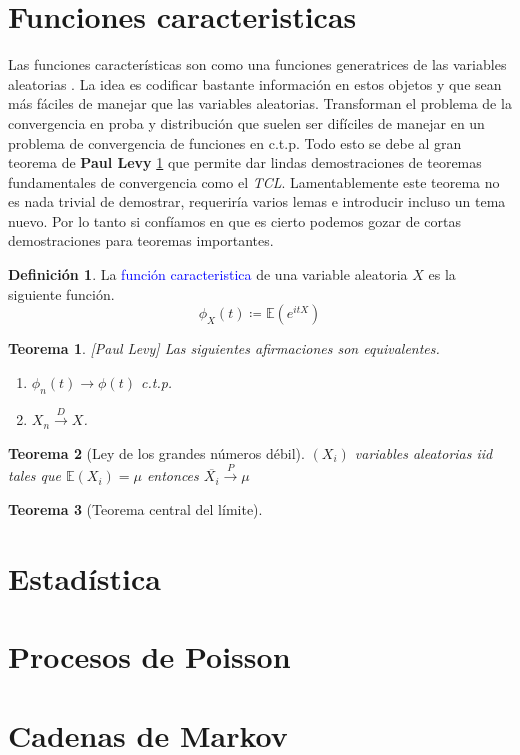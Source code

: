 \documentclass[11pt]{article}
\theoremstyle{plain} %
\newtheorem{teorema}{Teorema}
\theoremstyle{definition}
\newtheorem*{definicion}{Definici\'{o}n} %
\theoremstyle{remark}
\def\E{\mathbb{E}}
\def\va{variable aleatoria }
\def\vas{variables aleatorias }
\def\blue{\textcolor{blue}}
\newcommand{\proba}{\overset{P}{\to}}
\newcommand{\dist}{\overset{D}{\to}}
\begin{document}
\bigskip
\section{Funciones caracteristicas}

Las funciones características son como una funciones generatrices de las \vas. La idea es codificar bastante información en estos objetos y que sean más fáciles de manejar que las variables aleatorias. Transforman el problema de la convergencia en proba y distribución que suelen ser difíciles de manejar en un problema de convergencia de funciones en c.t.p. Todo esto se debe al gran teorema de \textbf{Paul Levy} \ref{teo:levy} que permite dar lindas demostraciones de teoremas fundamentales de convergencia como el \textit{TCL}. Lamentablemente este teorema no es nada trivial de demostrar, requeriría varios lemas e introducir incluso un tema nuevo. Por lo tanto si confíamos en que es cierto podemos gozar de cortas demostraciones para teoremas importantes.

\begin{definicion}
	La \blue{función caracteristica} de una \va $X$ es la siguiente función. 
	\[ \phi_{X}(t) \coloneqq \E(e^{itX}) \]
\end{definicion}

\begin{teorema}
	\label{teo:levy}
	[Paul Levy]
	Las siguientes afirmaciones son equivalentes.
	\begin{enumerate}
		\item $\phi_{n}(t) \to \phi(t)$ c.t.p.
		\item $X_n \dist X$.
	\end{enumerate}
\end{teorema}

\begin{teorema}
	[Ley de los grandes números débil]
	$(X_i) $ \vas iid tales que $\E(X_i) = \mu$ entonces $\overline{X_i} \proba \mu$
\end{teorema}

\begin{teorema}		
	[Teorema central del límite]
	
\end{teorema}

\bigskip
\section{Estadística}


\bigskip
\section{Procesos de Poisson}
\bigskip
\section{Cadenas de Markov}
\end{document}
